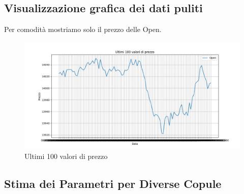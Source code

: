 \documentclass[%
	corpo=11pt,
    twoside,
    stile=classica,
    oldstyle,
    tipotesi=custom,
    greek,
    evenboxes,
]{toptesi}
\begin{document}
\subsection*{Visualizzazione grafica dei dati puliti}
Per comodità mostriamo solo il prezzo delle Open.

\begin{figure}[h]
	\centering
	\includegraphics[width=1.1\textwidth]{Pictures/price_chart.png}
	\caption{Ultimi 100 valori di prezzo}
	\label{fig:price_chart}
\end{figure}

\subsection{Stima dei Parametri per Diverse Copule}






















\nocite{*}  %
\end{document}
